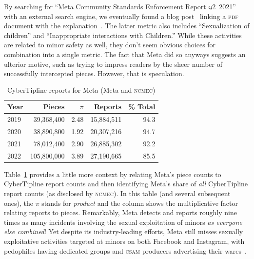 \documentclass[nonacm,screen]{acmart}
\newcommand\V[1]{\textsc{\MakeLowercase{#1}}}
\begin{document}
\begin{itemize}
{By searching for ``Meta Community Standards Enforcement Report \V{\V{Q2}}~2021''
with an external search engine, we eventually found a blog
post~\cite{Facebook2021a} linking a \V{PDF} document with the
explanation~\cite{Facebook2021}. The latter metric also includes ``Sexualization
of children'' and ``Inappropriate interactions with Children.'' While these
activities are related to minor safety as well, they don't seem obvious choices
for combination into a single metric. The fact that Meta did so anyways suggests
an ulterior motive, such as trying to impress readers by the sheer number of
successfully intercepted pieces. However, that is speculation.

\begin{table}[h!]
\centering\libertineLF
\caption{CyberTipline reports for Meta (Meta and \V{NCMEC})}
\label{tab:meta-pieces-and-reports}
\begin{tabular}{lrrrr}
\textbf{Year} & \textbf{Pieces} & $\pi$ & \textbf{Reports} & \textbf{\% Total} \\ \hline
2019 & 39,368,400 & 2.48 & 15,884,511 & 94.3 \\
2020 & 38,890,800 & 1.92 & 20,307,216 & 94.7 \\
2021 & 78,012,400 & 2.90 & 26,885,302 & 92.2 \\
2022 & 105,800,000 & 3.89 & 27,190,665 & 85.5 \\
\end{tabular}
\end{table}

Table~\ref{tab:meta-pieces-and-reports} provides a little more context by
relating Meta's piece counts to CyberTipline report counts and then identifying
Meta's share of \emph{all} CyberTipline report counts (as disclosed by
\V{NCMEC}). In this table (and several subsequent ones), the $\pi$ stands for
\emph{product} and the column shows the multiplicative factor relating reports
to pieces. Remarkably, Meta detects and reports roughly nine times as many
incidents involving the sexual exploitation of minors \emph{as everyone else
combined}! Yet despite its industry-leading efforts, Meta still misses sexually
exploitative activities targeted at minors on both Facebook and Instagram, with
pedophiles having dedicated groups and \V{CSAM} producers advertising their
wares~\cite{HorwitzBlunt2023,HorwitzBlunt2023a}.

}
\end{itemize}
\end{document}
